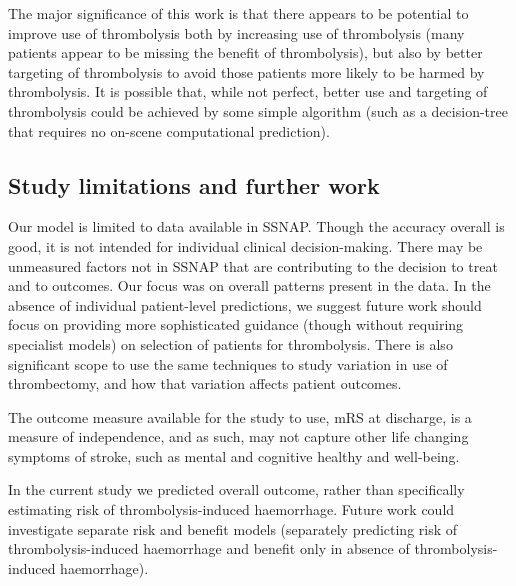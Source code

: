 
The major significance of this work is that there appears to be potential to improve use of thrombolysis both by increasing use of thrombolysis (many patients appear to be missing the benefit of thrombolysis), but also by better targeting of thrombolysis to avoid those patients more likely to be harmed by thrombolysis. It is possible that, while not perfect, better use and targeting of thrombolysis could be achieved by some simple algorithm (such as a decision-tree that requires no on-scene computational prediction). 


\subsection{Study limitations and further work}

Our model is limited to data available in SSNAP. Though the accuracy overall is good, it is not intended for individual clinical decision-making. There may be unmeasured factors not in SSNAP that are contributing to the decision to treat and to outcomes. Our focus was on overall patterns present in the data. In the absence of individual patient-level predictions, we suggest future work should focus on providing more sophisticated guidance (though without requiring specialist models) on selection of patients for thrombolysis. There is also significant scope to use the same techniques to study variation in use of thrombectomy, and how that variation affects patient outcomes.

The outcome measure available for the study to use, mRS at discharge, is a measure of independence, and as such, may not capture other life changing symptoms of stroke, such as mental and cognitive healthy and well-being.

In the current study we predicted overall outcome, rather than specifically estimating risk of thrombolysis-induced haemorrhage. Future work could investigate separate risk and benefit models (separately predicting risk of thrombolysis-induced haemorrhage and benefit only in absence of thrombolysis-induced haemorrhage). 